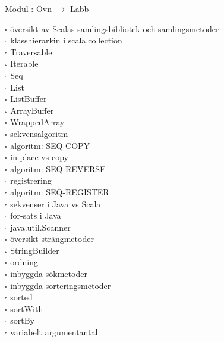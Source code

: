 
    Modul : Övn  $\rightarrow$ Labb 
    \begin{multicols}{3}\SlideFontTiny
    $\square$ översikt av Scalas samlingsbibliotek och samlingsmetoder \\
$\square$ klasshierarkin i scala.collection \\
$\square$ Traversable \\
$\square$ Iterable \\
$\square$ Seq \\
$\square$ List \\
$\square$ ListBuffer \\
$\square$ ArrayBuffer \\
$\square$ WrappedArray \\
$\square$ sekvensalgoritm \\
$\square$ algoritm: SEQ-COPY \\
$\square$ in-place vs copy \\
$\square$ algoritm: SEQ-REVERSE \\
$\square$ registrering \\
$\square$ algoritm: SEQ-REGISTER \\
$\square$ sekvenser i Java vs Scala \\
$\square$ for-sats i Java \\
$\square$ java.util.Scanner \\
$\square$ översikt strängmetoder \\
$\square$ StringBuilder \\
$\square$ ordning \\
$\square$ inbyggda sökmetoder \\
$\square$ inbyggda sorteringsmetoder \\
$\square$ sorted \\
$\square$ sortWith \\
$\square$ sortBy \\
$\square$ variabelt argumentantal \\
    \end{multicols}
    